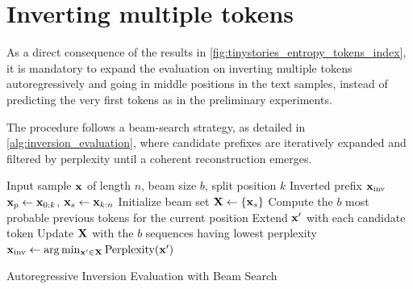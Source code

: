 \documentclass[../thesis.tex]{subfiles}
\begin{document}
\section{Inverting multiple tokens}
\label{sec:invert_sentence}
As a direct consequence of the results in \cref{fig:tinystories_entropy_tokens_index},
it is mandatory to expand the evaluation on inverting multiple tokens autoregressively and going in middle positions in the text samples, instead of predicting the very first tokens as in the preliminary experiments.


The procedure follows a beam-search strategy, as detailed in \cref{alg:inversion_evaluation}, where candidate prefixes are iteratively expanded and filtered by perplexity until a coherent reconstruction emerges.

\begin{algorithm}[t]
\begin{algorithmic}[1]
\Require Input sample $\mathbf{x}$ of length $n$, beam size $b$, split position $k$
\Ensure Inverted prefix $\mathbf{x}_{\text{inv}}$
\State $\mathbf{x}_p \gets \mathbf{x}_{0:k}$, \quad $\mathbf{x}_s \gets \mathbf{x}_{k:n}$
\State Initialize beam set $\mathbf{X} \gets \{\mathbf{x}_s\}$
        \State Compute the $b$ most probable previous tokens for the current position 
        \State Extend $\mathbf{x}'$ with each candidate token
    \EndFor
    \State Update $\mathbf{X}$ with the $b$ sequences having lowest perplexity
\EndWhile
\State \Return $\mathbf{x}_{\text{inv}} \gets \arg\min_{\mathbf{x}' \in \mathbf{X}} \text{Perplexity}(\mathbf{x}')$
\end{algorithmic}
\caption{Autoregressive Inversion Evaluation with Beam Search}
\label{alg:inversion_evaluation}
\end{algorithm}
\end{document}
